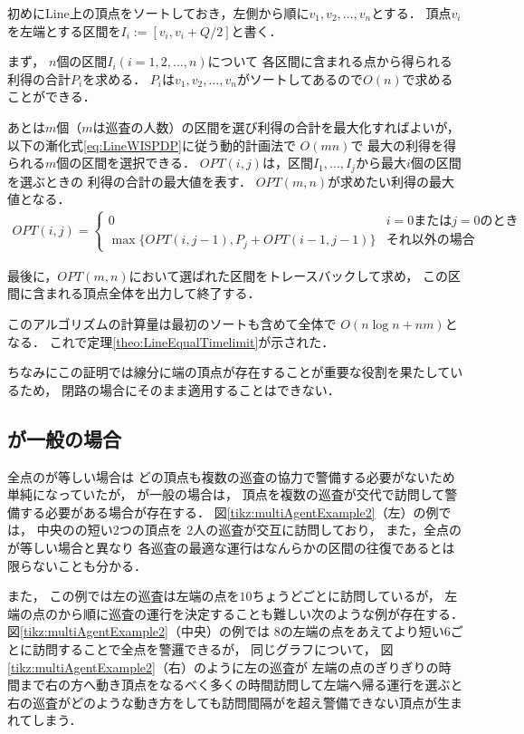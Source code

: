 初めにLine上の頂点をソートしておき，左側から順に$v_1,v_2,\ldots,v_n$とする．
頂点$v_i$を左端とする区間を$I_i := [v_i, v_i + Q/2]$と書く．

まず，
$n$個の区間$I_i (i = 1,2,\ldots, n)$について
各区間に含まれる点から得られる利得の合計$P_i$を求める．
$P_i$は$v_1,v_2,\ldots,v_n$がソートしてあるので$O(n)$で求めることができる．

あとは$m$個（$m$は巡査の人数）の区間を選び利得の合計を最大化すればよいが，
以下の漸化式\ref{eq:LineWISPDP}に従う動的計画法で
$O(mn)$で
最大の利得を得られる$m$個の区間を選択できる．
$OPT(i,j)$は，区間$I_1, \ldots, I_j$から最大$i$個の区間を選ぶときの
利得の合計の最大値を表す．
$OPT(m,n)$が求めたい利得の最大値となる．
\begin{align}
  \label{eq:LineWISPDP}
  OPT(i,j) = 
  \begin{cases}
    0 & \text{$i = 0$または$j = 0$のとき} \\
    \max \{
      OPT(i, j - 1), 
      P_j + OPT(i - 1, j - 1)
    \}
    & \text{それ以外の場合}
  \end{cases}
\end{align}

最後に，$OPT(m,n)$において選ばれた区間をトレースバックして求め，
この区間に含まれる頂点全体を出力して終了する．

このアルゴリズムの計算量は最初のソートも含めて全体で
$O(n \log n + nm)$となる．
これで定理\ref{theo:LineEqualTimelimit}が示された．



ちなみにこの証明では線分に端の頂点が存在することが重要な役割を果たしているため，
閉路の場合にそのまま適用することはできない．


\subsection{{\idletime}が一般の場合}
\label{subsec:LineDifferentTimelimit}

全点の{\idletime}が等しい場合は
どの頂点も複数の巡査の協力で警備する必要がないため単純になっていたが，
{\idletime}が一般の場合は，
頂点を複数の巡査が交代で訪問して警備する必要がある場合が存在する．
%
図\ref{tikz:multiAgentExample2}（左）の例では，
中央の{\idletime}の短い2つの頂点を
2人の巡査が交互に訪問しており，
また，全点の{\idletime}が等しい場合と異なり
各巡査の最適な運行はなんらかの区間の往復であるとは限らないことも分かる．


また，
この例では左の巡査は左端の点を{\idletime}$10$ちょうどごとに訪問しているが，
左端の点の{\idletime}から順に巡査の運行を決定することも難しい次のような例が存在する．
図\ref{tikz:multiAgentExample2}（中央）の例では
{\idletime}$8$の左端の点をあえてより短い$6$ごとに訪問することで全点を警邏できるが，
同じグラフについて，
図\ref{tikz:multiAgentExample2}（右）のように左の巡査が
左端の点の{\idletime}ぎりぎりの時間まで右の方へ動き頂点をなるべく多くの時間訪問して左端へ帰る運行を選ぶと
右の巡査がどのような動き方をしても訪問間隔が{\idletime}を超え警備できない頂点が生まれてしまう．



